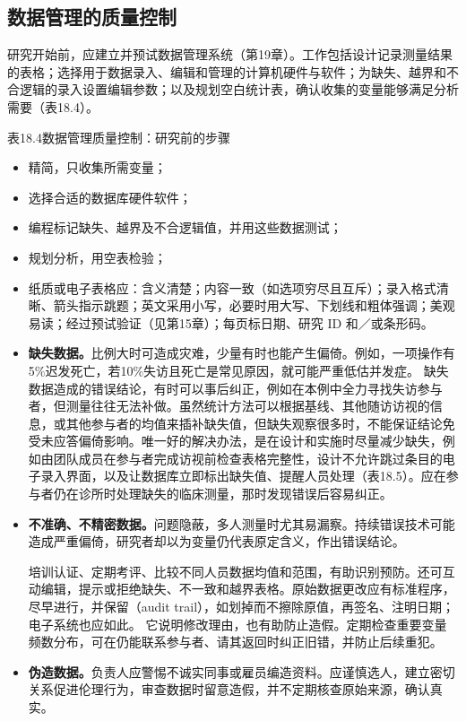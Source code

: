 \subsection{数据管理的质量控制}
研究开始前，应建立并预试数据管理系统（第19章）。工作包括设计记录测量结果的表格；选择用于数据录入、编辑和管理的计算机硬件与软件；为缺失、越界和不合逻辑的录入设置编辑参数；以及规划空白统计表，确认收集的变量能够满足分析需要（表18.4）。
\begin{bookbox}{表18.4\quad 数据管理质量控制：研究前的步骤}
\begin{itemize}
\item 精简，只收集所需变量；
\item 选择合适的数据库硬件软件；
\item 编程标记缺失、越界及不合逻辑值，并用这些数据测试；
\item 规划分析，用空表检验；
\item 纸质或电子表格应：含义清楚；内容一致（如选项穷尽且互斥）；录入格式清晰、箭头指示跳题；英文采用小写，必要时用大写、下划线和粗体强调；美观易读；经过预试验证（见第15章）；每页标日期、研究 ID 和／或条形码。
\end{itemize}
\end{bookbox}
\begin{itemize}
\item \textbf{缺失数据。}比例大时可造成灾难，少量有时也能产生偏倚。例如，一项操作有5\%迟发死亡，若10\%失访且死亡是常见原因，就可能严重低估并发症。
缺失数据造成的错误结论，有时可以事后纠正，例如在本例中全力寻找失访参与者，但测量往往无法补做。虽然统计方法可以根据基线、其他随访访视的信息，或其他参与者的均值来插补缺失值，但缺失观察很多时，不能保证结论免受未应答偏倚影响。唯一好的解决办法，是在设计和实施时尽量减少缺失，例如由团队成员在参与者完成访视前检查表格完整性，设计不允许跳过条目的电子录入界面，以及让数据库立即标出缺失值、提醒人员处理（表18.5）。应在参与者仍在诊所时处理缺失的临床测量，那时发现错误后容易纠正。
\item \textbf{不准确、不精密数据。}问题隐蔽，多人测量时尤其易漏察。持续错误技术可能造成严重偏倚，研究者却以为变量仍代表原定含义，作出错误结论。

培训认证、定期考评、比较不同人员数据均值和范围，有助识别预防。还可互动编辑，提示或拒绝缺失、不一致和越界表格。原始数据更改应有标准程序，尽早进行，并保留（audit trail），如划掉而不擦除原值，再签名、注明日期；电子系统也应如此。
它说明修改理由，也有助防止造假。定期检查重要变量频数分布，可在仍能联系参与者、请其返回时纠正旧错，并防止后续重犯。
\item \textbf{伪造数据。}负责人应警惕不诚实同事或雇员编造资料。应谨慎选人，建立密切关系促进伦理行为，审查数据时留意造假，并不定期核查原始来源，确认真实。
\end{itemize}

